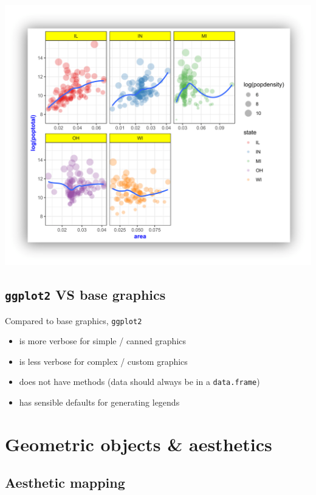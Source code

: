 \documentclass[
]{book}
\providecommand{\tightlist}{%
  \setlength{\itemsep}{0pt}\setlength{\parskip}{0pt}}
\begin{document}
\includegraphics{R/Rgraphics/images/final_plot.png}

\hypertarget{ggplot2-vs-base-graphics}{%
\subsection{\texorpdfstring{\texttt{ggplot2} VS base graphics}{ggplot2 VS base graphics}}\label{ggplot2-vs-base-graphics}}

Compared to base graphics, \texttt{ggplot2}

\begin{itemize}
\tightlist
\item
  is more verbose for simple / canned graphics
\item
  is less verbose for complex / custom graphics
\item
  does not have methods (data should always be in a \texttt{data.frame})
\item
  has sensible defaults for generating legends
\end{itemize}

\hypertarget{geometric-objects-aesthetics}{%
\section{Geometric objects \& aesthetics}\label{geometric-objects-aesthetics}}

\hypertarget{aesthetic-mapping}{%
\subsection{Aesthetic mapping}\label{aesthetic-mapping}}
\end{document}
